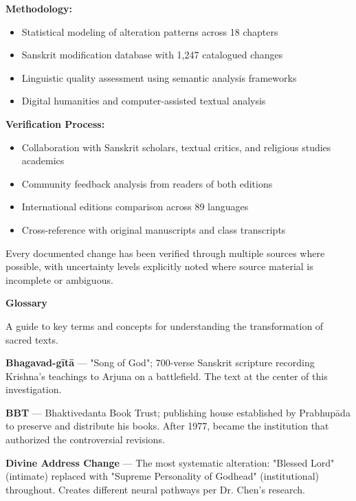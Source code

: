 \documentclass[11pt,twoside]{book}
\begin{document}
\textbf{\textbf{Methodology:}}
\begin{itemize}
\item Statistical modeling of alteration patterns across 18 chapters
\item Sanskrit modification database with 1,247 catalogued changes
\item Linguistic quality assessment using semantic analysis frameworks
\item Digital humanities and computer-assisted textual analysis
\end{itemize}

\textbf{\textbf{Verification Process:}}
\begin{itemize}
\item Collaboration with Sanskrit scholars, textual critics, and religious studies academics
\item Community feedback analysis from readers of both editions
\item International editions comparison across 89 languages
\item Cross-reference with original manuscripts and class transcripts
\end{itemize}

Every documented change has been verified through multiple sources where possible, with uncertainty levels explicitly noted where source material is incomplete or ambiguous.

\clearpage
\pagestyle{sectionopening}
\thispagestyle{sectionopening}
\markboth{}{}
\markright{}
\vspace*{0.25\textheight}
\begin{center}
{\Huge\bfseries Glossary}
\end{center}
\newpage

A guide to key terms and concepts for understanding the transformation of sacred texts.

\textbf{\textbf{Bhagavad-gītā}} — "Song of God"; 700-verse Sanskrit scripture recording Krishna's teachings to Arjuna on a battlefield. The text at the center of this investigation.

\textbf{\textbf{BBT}} — Bhaktivedanta Book Trust; publishing house established by Prabhupāda to preserve and distribute his books. After 1977, became the institution that authorized the controversial revisions.

\textbf{\textbf{Divine Address Change}} — The most systematic alteration: "Blessed Lord" (intimate) replaced with "Supreme Personality of Godhead" (institutional) throughout. Creates different neural pathways per Dr. Chen's research.
\end{document}
